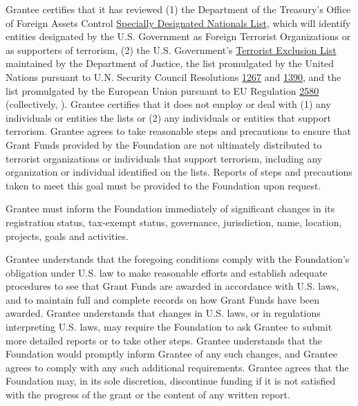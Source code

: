 \documentclass{article}
\begin{document}
Grantee certifies that it has reviewed (1) the Department of the Treasury’s Office of Foreign Assets Control \href{https://www.treasury.gov/resource-center/sanctions/SDN-List/Pages/default.aspx}{Specially Designated Nationals List}, which will identify entities designated by the U.S. Government as Foreign Terrorist Organizations or as supporters of terrorism, (2) the U.S. Government's \href{https://www.state.gov/j/ct/rls/other/des/123086.htm}{Terrorist Exclusion List} maintained by the Department of Justice, the list promulgated by the United Nations pursuant to U.N. Security Council Resolutions \href{https://www.un.org/sc/suborg/en/sanctions/1267/aq_sanctions_list}{1267} and \href{https://www.un.org/en/ga/search/view_doc.asp?symbol=S/RES/1390(2002)}{1390}, and the list promulgated by the European Union pursuant to EU Regulation \href{https://www.loc.gov/law/help/EUTerroristLists.pdf}{2580} (collectively, ). Grantee certifies that it does not employ or deal with (1) any individuals or entities the lists or (2) any individuals or entities that support terrorism. Grantee agrees to take reasonable steps and precautions to ensure that Grant Funds provided by the Foundation are not ultimately distributed to terrorist organizations or individuals that support terrorism, including any organization or individual identified on the lists. Reports of steps and precautions taken to meet this goal must be provided to the Foundation upon request.
\par
Grantee must inform the Foundation immediately of significant changes in its registration status, tax-exempt status, governance, jurisdiction, name, location, projects, goals and activities.
\par
Grantee understands that the foregoing conditions comply with the Foundation’s obligation under U.S. law to make reasonable efforts and establish adequate procedures to see that Grant Funds are awarded in accordance with U.S. laws, and to maintain full and complete records on how Grant Funds have been awarded. Grantee understands that changes in U.S. laws, or in regulations interpreting U.S. laws, may require the Foundation to ask Grantee to submit more detailed reports or to take other steps. Grantee understands that the Foundation would promptly inform Grantee of any such changes, and Grantee agrees to comply with any such additional requirements.  Grantee agrees that the Foundation may, in its sole discretion, discontinue funding if it is not satisfied with the progress of the grant or the content of any written report.
\par
\end{document}

